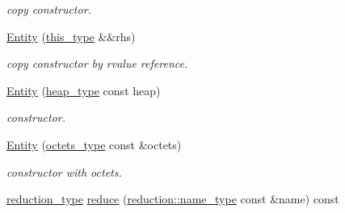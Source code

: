 \begin{DoxyCompactItemize}
\begin{DoxyCompactList}\small\item\em copy constructor. \end{DoxyCompactList}\item 
\hypertarget{classhryky_1_1uri_1_1regname_1_1_entity_ac769064a5692cf920ba3f1fdb6565d17}{\hyperlink{classhryky_1_1uri_1_1regname_1_1_entity_ac769064a5692cf920ba3f1fdb6565d17}{Entity} (\hyperlink{classhryky_1_1uri_1_1regname_1_1_entity_ab3e7322abf5cdcaca367ea56179c1862}{this\-\_\-type} \&\&rhs)}\label{classhryky_1_1uri_1_1regname_1_1_entity_ac769064a5692cf920ba3f1fdb6565d17}

\begin{DoxyCompactList}\small\item\em copy constructor by rvalue reference. \end{DoxyCompactList}\item 
\hypertarget{classhryky_1_1uri_1_1regname_1_1_entity_ac6d0ba2071b9a6c1aa5f729dbdbd81c0}{\hyperlink{classhryky_1_1uri_1_1regname_1_1_entity_ac6d0ba2071b9a6c1aa5f729dbdbd81c0}{Entity} (\hyperlink{classhryky_1_1memory_1_1heap_1_1_base}{heap\-\_\-type} const heap)}\label{classhryky_1_1uri_1_1regname_1_1_entity_ac6d0ba2071b9a6c1aa5f729dbdbd81c0}

\begin{DoxyCompactList}\small\item\em constructor. \end{DoxyCompactList}\item 
\hypertarget{classhryky_1_1uri_1_1regname_1_1_entity_a28103bb4000582d37c056c2a04670c50}{\hyperlink{classhryky_1_1uri_1_1regname_1_1_entity_a28103bb4000582d37c056c2a04670c50}{Entity} (\hyperlink{classhryky_1_1_vector}{octets\-\_\-type} const \&octets)}\label{classhryky_1_1uri_1_1regname_1_1_entity_a28103bb4000582d37c056c2a04670c50}

\begin{DoxyCompactList}\small\item\em constructor with octets. \end{DoxyCompactList}\item 
\hypertarget{classhryky_1_1uri_1_1regname_1_1_entity_a143ce2095d2c5c89459f95c6c3bff26f}{\hyperlink{namespacehryky_a343a9a4c36a586be5c2693156200eadc}{reduction\-\_\-type} \hyperlink{classhryky_1_1uri_1_1regname_1_1_entity_a143ce2095d2c5c89459f95c6c3bff26f}{reduce} (\hyperlink{namespacehryky_1_1reduction_ac686c30a4c8d196bbd0f05629a6b921f}{reduction\-::name\-\_\-type} const \&name) const }\label{classhryky_1_1uri_1_1regname_1_1_entity_a143ce2095d2c5c89459f95c6c3bff26f}


\end{DoxyCompactItemize}
